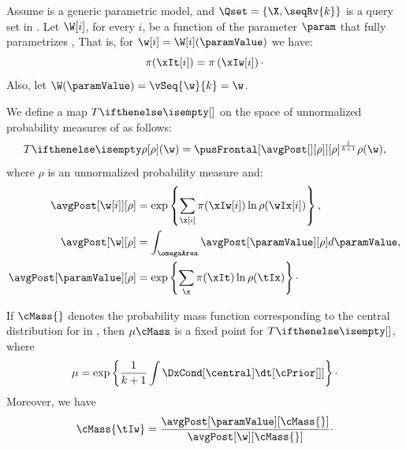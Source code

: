\begin{theorem}
    \label{th:fixed_point}
    Assume \pmodel is a generic parametric model, and $\Qset = \{\X, \seqRv{k}\}$ is a query set in \Mt.
    Let $\W[i]$, for every $i$, be a function of the parameter $\param$ that fully parametrizes \X[i],
    That is, for $\w[i] = \W[i](\paramValue)$ we have:
    \begin{equation}
        \pi(\xIt[i]) = \pi \left( \xIw[i] \right)\cdot
        \label{eq:func_of_theta}
    \end{equation}
    Also, let $\W(\paramValue) = \vSeq{\w}{k} = \w$.

    We define a map $\fpMap{}$ on the space of unnormalized probability measures of \w as follows:
    \begin{equation}
        \fpMap{\rho}(\w) = \pusFrontal[{\avgPost[][\rho]}][\rho]^{\frac{1}{k+1}} \rho(\w) ,
        \label{eq:pus_frontal}
    \end{equation}
    where $\rho$ is an unnormalized probability measure and:
    \begin{align*}
        \avgPost[{\w[i]}][\rho] &= \exp \left\{\sum_{\x[i]} \pi(\xIw[i]) \ln \rho(\wIx[i]) \right\},\\
        \avgPost[\w][\rho] &= \int_{\omegaArea} \avgPost[\paramValue][\rho] d\paramValue,\\
        \avgPost[\paramValue][\rho] &= \exp \left\{\sum_{\x} \pi(\xIt) \ln \rho(\tIx) \right\} \cdot\\
    \end{align*}

    If $\cMass{}$ denotes the probability mass function corresponding to the central distribution for \Qset in \Mt,
    then $\fixedPoint$ is a fixed point for $\fpMap{}$, where
    \[
        \mu = \exp \left\{\frac{1}{k+1}\int \DxCond[\central] \dt[\cPrior[]] \right\} \cdot
    \]
    Moreover, we have
    \begin{equation}
        \cMass{\tIw} = \frac{\avgPost[\paramValue][\cMass{}]}{\avgPost[\w][\cMass{}]} \cdot
        \label{eq:conditional_for_theta}
    \end{equation}
\end{theorem}

